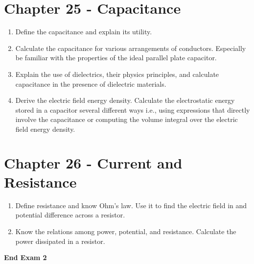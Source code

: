 \documentclass[12pt]{article}
\begin{document}
\section*{Chapter 25 - Capacitance}
\begin{enumerate}
    \item Define the capacitance and explain its utility.
    \item Calculate the capacitance for various arrangements of conductors. Especially be familiar with the properties of the ideal parallel plate capacitor.
    \item Explain the use of dielectrics, their physics principles, and calculate capacitance in the presence of dielectric materials.
    \item Derive the electric field energy density. Calculate the electrostatic energy stored in a capacitor several different ways i.e., using expressions that directly involve the capacitance or computing the volume integral over the electric field energy density.
\end{enumerate}
\section*{Chapter 26 - Current and Resistance}
\begin{enumerate}
    \item Define resistance and know Ohm's law. Use it to find the electric field in and potential difference across a resistor.
    \item Know the relations among power, potential, and resistance. Calculate the power dissipated in a resistor.
\end{enumerate}
\textbf{End Exam 2}
\end{document}
